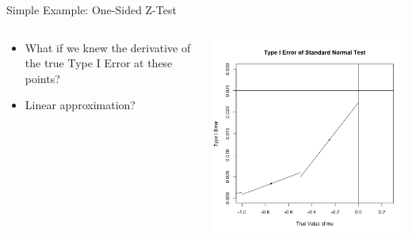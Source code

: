 \begin{frame}{Simple Example: One-Sided Z-Test}

\begin{columns}
\begin{column}{.3\textwidth}
\begin{itemize}
\item What if we knew the derivative of the true Type I Error at these points?
\item Linear approximation?
\end{itemize}
\end{column}

\begin{column}{.7\textwidth}
\includegraphics[width=\textwidth]{figures/z-test-5.png}
\end{column}
\end{columns}

\end{frame}

